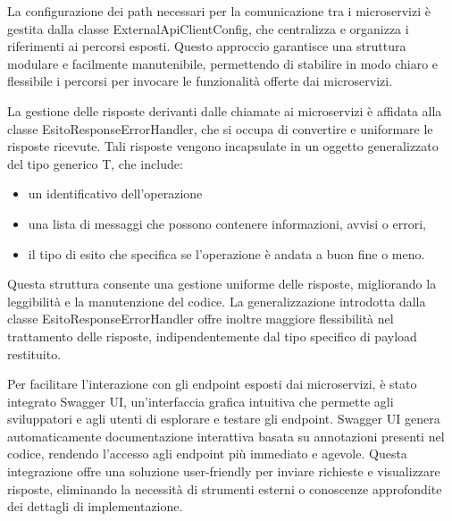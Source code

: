 \documentclass[a4paper,twoside,12pt]{toptesi}
\begin{document}
La configurazione dei path necessari per la comunicazione tra i microservizi è gestita dalla classe ExternalApiClientConfig, che centralizza e organizza i riferimenti ai percorsi esposti. Questo approccio garantisce una struttura modulare e facilmente manutenibile, permettendo di stabilire in modo chiaro e flessibile i percorsi per invocare le funzionalità offerte dai microservizi.

La gestione delle risposte derivanti dalle chiamate ai microservizi è affidata alla classe EsitoResponseErrorHandler, che si occupa di convertire e uniformare le risposte ricevute. Tali risposte vengono incapsulate in un oggetto generalizzato del tipo generico T, che include:

\begin{itemize}
\item un identificativo dell'operazione
\item una lista di messaggi che possono contenere informazioni, avvisi o errori,
\item il tipo di esito che specifica se l'operazione è andata a buon fine o meno.
\end{itemize}

Questa struttura consente una gestione uniforme delle risposte, migliorando la leggibilità e la manutenzione del codice. La generalizzazione introdotta dalla classe EsitoResponseErrorHandler offre inoltre maggiore flessibilità nel trattamento delle risposte, indipendentemente dal tipo specifico di payload restituito.

Per facilitare l'interazione con gli endpoint esposti dai microservizi, è stato integrato Swagger UI, un'interfaccia grafica intuitiva che permette agli sviluppatori e agli utenti di esplorare e testare gli endpoint. Swagger UI genera automaticamente documentazione interattiva basata su annotazioni presenti nel codice, rendendo l'accesso agli endpoint più immediato e agevole. Questa integrazione offre una soluzione user-friendly per inviare richieste e visualizzare risposte, eliminando la necessità di strumenti esterni o conoscenze approfondite dei dettagli di implementazione.

  


\end{document}
